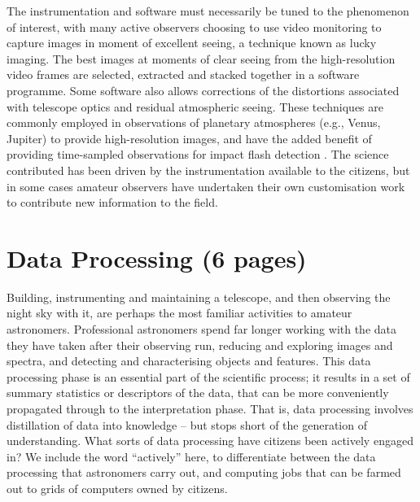 \documentclass{ar2e}
\begin{document}
The instrumentation and software must necessarily be tuned to the phenomenon
of interest, with many active observers choosing to use video monitoring to
capture images in moment of excellent seeing, a technique known as lucky
imaging.  The best images at moments of clear seeing from the high-resolution
video frames are selected, extracted and stacked together in a software
programme.  Some software also allows corrections of the distortions
associated with telescope optics and residual atmospheric seeing.  These
techniques are commonly employed in observations of planetary atmospheres
(e.g., Venus, Jupiter) to provide high-resolution images, and have the added
benefit of providing time-sampled observations for impact flash detection
\citep[e.g.,][]{10hueso}.
The science contributed has been driven by the instrumentation available to
the citizens, but in some cases amateur observers have undertaken their own
customisation work to contribute new information to the field.  



% 
% 


% 
% 


\section{Data Processing (6 pages)}
\label{sec:class}

Building, instrumenting and maintaining a telescope, and then observing the
night sky with it, are perhaps the most familiar activities to amateur
astronomers. Professional astronomers spend far longer working with the data
they have taken after their observing run, reducing and exploring images and
spectra, and detecting and characterising objects and features. This data
processing phase is an essential part of the scientific process; it results in a
set of summary statistics or descriptors of the data, that can be more
conveniently propagated through to the interpretation phase. That is, data
processing involves distillation of data into knowledge -- but stops short of
the generation of understanding. What sorts of data processing have citizens
been actively engaged in? We include the word ``actively'' here, to
differentiate between the data processing that astronomers carry out, and 
computing jobs that can be farmed out to grids of computers owned by citizens. 
\end{document}
